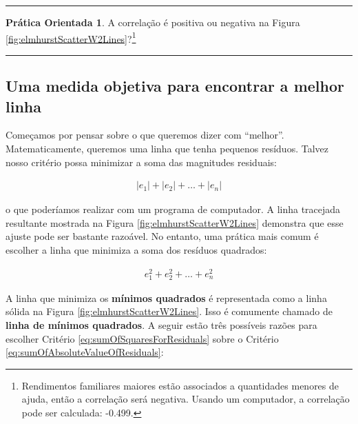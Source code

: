 \documentclass[
]{book}
\theoremstyle{definition}
\theoremstyle{definition}
\theoremstyle{definition}
\newtheorem{exercise}{Prática Orientada}[chapter]
\theoremstyle{definition}
\theoremstyle{remark}
\begin{document}
\begin{center}\rule{0.5\linewidth}{0.5pt}\end{center}

\begin{exercise}
\protect\hypertarget{exr:unnamed-chunk-272}{}{\label{exr:unnamed-chunk-272} }A correlação é positiva ou negativa na Figura \ref{fig:elmhurstScatterW2Lines}?\footnote{Rendimentos familiares maiores estão associados a quantidades menores de ajuda, então a correlação será negativa. Usando um computador, a correlação pode ser calculada: -0.499.}
\end{exercise}

\begin{center}\rule{0.5\linewidth}{0.5pt}\end{center}

\hypertarget{objectiveMeasureToFindBestLine}{%
\subsection{Uma medida objetiva para encontrar a melhor linha}\label{objectiveMeasureToFindBestLine}}

Começamos por pensar sobre o que queremos dizer com ``melhor''. Matematicamente, queremos uma linha que tenha pequenos resíduos. Talvez nosso critério possa minimizar a soma das magnitudes residuais:

\begin{eqnarray}
|e_1| + |e_2| + \dots + |e_n|
\label{eq:sumOfAbsoluteValueOfResiduals}
\end{eqnarray}

o que poderíamos realizar com um programa de computador. A linha tracejada resultante mostrada na Figura \ref{fig:elmhurstScatterW2Lines} demonstra que esse ajuste pode ser bastante razoável. No entanto, uma prática mais comum é escolher a linha que minimiza a soma dos resíduos quadrados:

\begin{eqnarray}
e_{1}^2 + e_{2}^2 + \dots + e_{n}^2
\label{eq:sumOfSquaresForResiduals}
\end{eqnarray}

A linha que minimiza os \textbf{mínimos quadrados} é representada como a linha sólida na Figura \ref{fig:elmhurstScatterW2Lines}. Isso é comumente chamado de \textbf{linha de mínimos quadrados}. A seguir estão três possíveis razões para escolher Critério \eqref{eq:sumOfSquaresForResiduals} sobre o Critério \eqref{eq:sumOfAbsoluteValueOfResiduals}:
\end{document}
